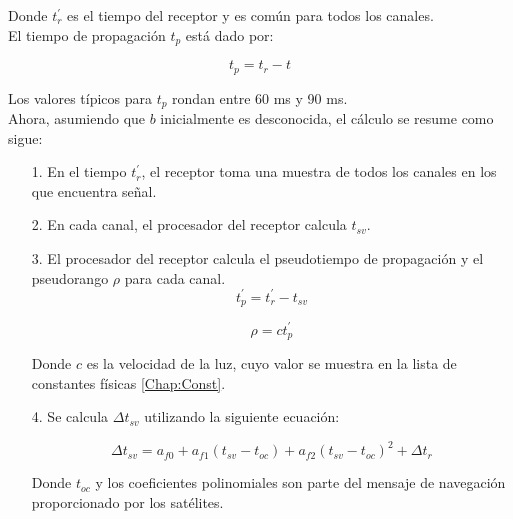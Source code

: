 Donde $t^{'}_r$ es el tiempo del receptor y es común para todos los canales. \\

El tiempo de propagación $t_p$ está dado por:

\begin{equation}
\label{Eq:t_p}
t_p = t_r - t
\end{equation}

Los valores típicos para $t_p$ rondan entre 60 ms y 90 ms. \\

Ahora, asumiendo que $b$ inicialmente es desconocida, el cálculo se resume como sigue:\\

\begin{itemize}
\item[1.] En el tiempo $t^{'}_r$, el receptor toma una muestra de todos los canales en los que encuentra señal.\\

\item[2.] En cada canal, el procesador del receptor calcula $t_{sv}$.\\

\item[3.] El procesador del receptor calcula el pseudotiempo de propagación y el pseudorango $\rho$ para cada canal.\\

\begin{equation}
\label{Eq:t'_p}
t^{'}_p = t^{'}_r - t_{sv}
\end{equation}

\begin{equation}
\label{Eq:rho}
\rho = ct^{'}_p
\end{equation}

Donde $c$ es la velocidad de la luz, cuyo valor se muestra en la lista de constantes físicas \ref{Chap:Const}.

\item[4.] Se calcula $\Delta t_{sv}$ utilizando la siguiente ecuación:

\begin{equation}
\label{Eq:Deltat_sv}
\Delta t_{sv}= a_{f0} + a_{f1}(t_{sv}-t_{oc}) + a_{f2}(t_{sv}-t_{oc})^2 + \Delta t_{r}
\end{equation}

Donde $t_{oc}$ y los coeficientes polinomiales son parte del mensaje de navegación proporcionado por los satélites.\\


\end{itemize}
